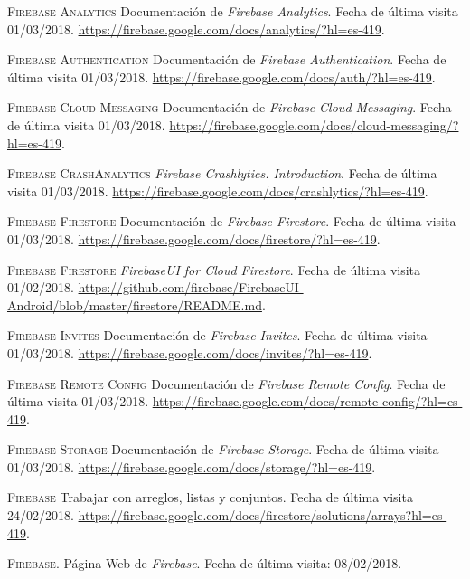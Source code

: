 \documentclass[twoside]{report}
\begin{document}
\begin{thebibliography}{a}
 \textsc{Firebase Analytics} 
Documentación de \textit{Firebase Analytics}. Fecha de última visita 01/03/2018. \url{https://firebase.google.com/docs/analytics/?hl=es-419}.

 \textsc{Firebase Authentication} 
Documentación de \textit{Firebase Authentication}. Fecha de última visita 01/03/2018. \url{https://firebase.google.com/docs/auth/?hl=es-419}.

 \textsc{Firebase Cloud Messaging} 
Documentación de \textit{Firebase Cloud Messaging}. Fecha de última visita 01/03/2018. \url{https://firebase.google.com/docs/cloud-messaging/?hl=es-419}.

 \textsc{Firebase CrashAnalytics} 
\textit{Firebase Crashlytics. Introduction}. Fecha de última visita 01/03/2018. \url{https://firebase.google.com/docs/crashlytics/?hl=es-419}.

 \textsc{Firebase Firestore} 
Documentación de \textit{Firebase Firestore}. Fecha de última visita 01/03/2018. \url{https://firebase.google.com/docs/firestore/?hl=es-419}.

 \textsc{Firebase Firestore} \textit{FirebaseUI for Cloud Firestore}. Fecha de última visita 01/02/2018. \url{https://github.com/firebase/FirebaseUI-Android/blob/master/firestore/README.md}.

 \textsc{Firebase Invites} 
Documentación de \textit{Firebase Invites}. Fecha de última visita 01/03/2018. \url{https://firebase.google.com/docs/invites/?hl=es-419}.

 \textsc{Firebase Remote Config} 
Documentación de \textit{Firebase Remote Config}. Fecha de última visita 01/03/2018. \url{https://firebase.google.com/docs/remote-config/?hl=es-419}.

 \textsc{Firebase Storage} 
Documentación de \textit{Firebase Storage}. Fecha de última visita 01/03/2018. \url{https://firebase.google.com/docs/storage/?hl=es-419}.

 \textsc{Firebase} Trabajar con arreglos, listas y conjuntos. Fecha de última visita 24/02/2018.  \url{https://firebase.google.com/docs/firestore/solutions/arrays?hl=es-419}.

 \textsc{Firebase}. Página Web de \textit{Firebase}. Fecha de última visita: 08/02/2018.


\end{thebibliography}
\end{document}
